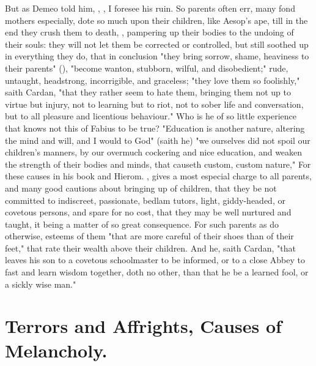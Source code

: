 But as Demeo told him, , , I foresee his ruin. So parents often err, many fond mothers
especially, dote so much upon their children, like Aesop's
ape, till in the end they crush them to death, , pampering up their bodies to the undoing of their souls: they will
not let them be corrected or controlled, but still soothed
up in everything they do, that in conclusion "they bring sorrow, shame,
heaviness to their parents" (), "become
wanton, stubborn, wilful, and disobedient;" rude, untaught, headstrong,
incorrigible, and graceless; "they love them so foolishly," saith
Cardan, "that they rather seem to hate them, bringing them
not up to virtue but injury, not to learning but to riot, not to sober life and
conversation, but to all pleasure and licentious behaviour." Who is he of so
little experience that knows not this of Fabius to be true?
"Education is another nature, altering the mind and will,
and I would to God" (saith he) "we ourselves did not spoil our children's
manners, by our overmuch cockering and nice education, and weaken the strength
of their bodies and minds, that causeth custom, custom nature," \etc{} For
these causes \Plutarch{} in his book  and
Hierom. , gives a most especial charge to all parents, and many good cautions
about bringing up of children, that they be not committed to indiscreet,
passionate, bedlam tutors, light, giddy-headed, or covetous persons, and spare
for no cost, that they may be well nurtured and taught, it being a matter of so
great consequence. For such parents as do otherwise, \Plutarch{} esteems of them
"that are more careful of their shoes than of their feet,"
that rate their wealth above their children. And he, saith
Cardan, "that leaves his son to a covetous schoolmaster to
be informed, or to a close Abbey to fast and learn wisdom together, doth no
other, than that he be a learned fool, or a sickly wise man."

\section{Terrors and Affrights, Causes of
Melancholy.}\label{sec:terrors-and-affrights}

